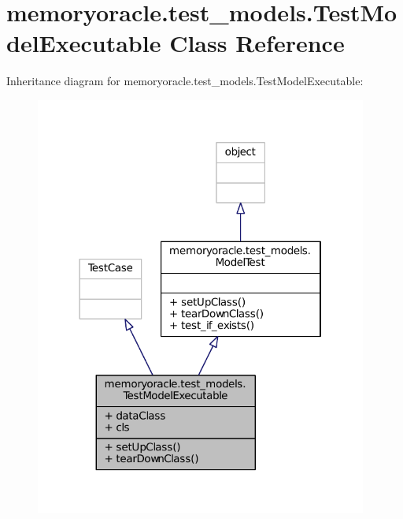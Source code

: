 \hypertarget{classmemoryoracle_1_1test__models_1_1TestModelExecutable}{}\section{memoryoracle.\+test\+\_\+models.\+Test\+Model\+Executable Class Reference}
\label{classmemoryoracle_1_1test__models_1_1TestModelExecutable}


Inheritance diagram for memoryoracle.\+test\+\_\+models.\+Test\+Model\+Executable\+:\nopagebreak
\begin{figure}[H]
\begin{center}
\leavevmode
\includegraphics[width=310pt]{classmemoryoracle_1_1test__models_1_1TestModelExecutable__inherit__graph}
\end{center}
\end{figure}


